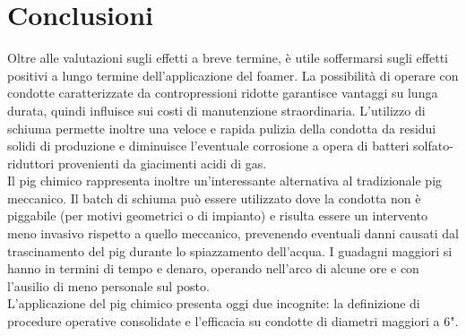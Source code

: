 \chapter*{Conclusioni}\thispagestyle{empty} 
Oltre alle valutazioni sugli effetti a breve termine, è utile soffermarsi sugli effetti positivi a lungo termine dell'applicazione del foamer. La possibilità di operare con condotte caratterizzate da contropressioni ridotte garantisce vantaggi su lunga durata, quindi influisce sui costi di manutenzione straordinaria. L'utilizzo di schiuma permette inoltre una veloce e rapida pulizia della condotta da residui solidi di produzione e diminuisce l'eventuale corrosione a opera di batteri solfato-riduttori provenienti da giacimenti acidi di gas.\\
Il pig chimico rappresenta inoltre un'interessante alternativa al tradizionale pig meccanico. Il batch di schiuma può essere utilizzato dove la condotta non è piggabile (per motivi geometrici o di impianto) e risulta essere un intervento meno invasivo rispetto a quello meccanico, prevenendo eventuali danni causati dal trascinamento del pig durante lo spiazzamento dell'acqua. I guadagni maggiori si hanno in termini di tempo e denaro, operando nell'arco di alcune ore e con l'ausilio di meno personale sul posto.\\
L'applicazione del pig chimico presenta oggi due incognite: la definizione di procedure operative consolidate e l'efficacia su condotte di diametri maggiori a 6".
\clearpage{\pagestyle{empty}\cleardoublepage}
